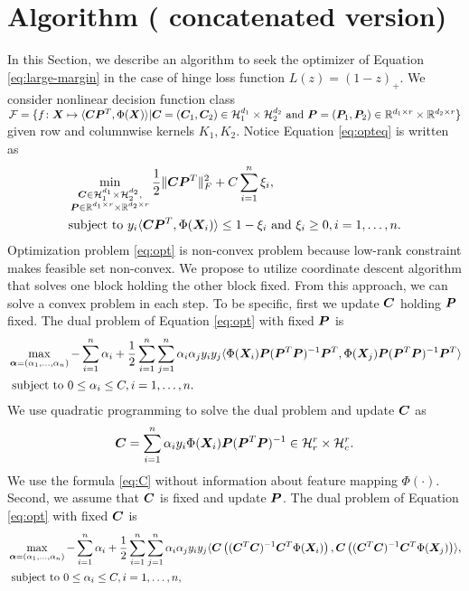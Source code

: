 \documentclass[12pt]{article}
\begin{document}
\section{Algorithm ({\color{red} concatenated version})}
\label{sec:alg}
In this Section, we describe an algorithm to seek the optimizer of Equation  \eqref{eq:large-margin} in the case of hinge loss function $L(z) = (1-z)_+$. We consider nonlinear decision function class $\mathcal{F} = \{f\colon\bm X\mapsto\langle\bm C \bm{P}^T,\Phi(\bm X)\rangle|\bm C = (\bm C_1,\bm C_2)\in\mathcal{H}_1^{d_1}\times \mathcal{H}_2^{d_2} \text{ and }\bm{P} = (\bm{P}_1,\bm{P}_2)\in\mathbb{R}^{d_1\times r} \times \mathbb{R}^{d_2\times r}\}$ given row and columnwise kernels $K_1,K_2$.
Notice Equation \eqref{eq:opteq} is written as 
\begin{align}
    \label{eq:opt}
    &\min_{\substack{\bm C\in\mathcal{H}_1^{d_1}\times \mathcal{H}_2^{d_2} ,\\\bm{P}\in\mathbb{R}^{d_1\times r} \times \mathbb{R}^{d_2\times r}}}\frac{1}{2}\lVert\bm C\bm{P}^T\rVert_F^2+ C\sum_{i=1}^n \xi_i,\\
    &\text{subject to } y_i\langle\bm C\bm{P}^T,\Phi(\bm X_i)\rangle\leq 1-\xi_i\text{ and } \xi_i\geq 0, i=1,\ldots,n.
\end{align}
Optimization problem \eqref{eq:opt} is non-convex problem because low-rank constraint makes feasible set non-convex.
We propose to utilize coordinate descent algorithm that solves one block holding the other block fixed. From this approach, we can solve a convex problem in each step.
To be specific, first we update $\bm C$ holding $\bm{P}$ fixed.
The dual problem of Equation \eqref{eq:opt} with fixed $\bm{P}$ is 
\begin{align}
    \label{eq:dual1}
    &\max_{\bm\alpha = (\alpha_1,\ldots,\alpha_n)}-\sum_{i=1}^n\alpha_i + \frac{1}{2}\sum_{i=1}^n\sum_{j=1}^n \alpha_i\alpha_j y_iy_j \langle \Phi(\bm X_i)\bm{P}(\bm{P}^T\bm{P})^{-1}\bm{P}^T,\Phi(\bm X_j)\bm{P}(\bm{P}^T\bm{P})^{-1}\bm{P}^T\rangle\\
    &\text{ subject to }  0\leq \alpha_i\leq C, i=1,\ldots,n.
\end{align}
We use quadratic programming to solve the dual problem and update $\bm C$ as
\begin{align}\label{eq:C}
    \bm C = \sum_{i=1}^n \alpha_iy_i \Phi(\bm X_i) \bm{P}(\bm{P}^T\bm{P})^{-1}\in\mathcal{H}_r^r\times \mathcal{H}_c^r.
\end{align}
We use the formula \eqref{eq:C} without information about feature mapping $\Phi(\cdot)$.
Second, we assume that $\bm C$ is fixed and update $\bm{P}$. The dual problem of Equation \eqref{eq:opt} with fixed $\bm C$ is 
\begin{align}
    \label{eq:dual2}
    &\max_{\bm\alpha = (\alpha_1,\ldots,\alpha_n)}-\sum_{i=1}^n\alpha_i + \frac{1}{2}\sum_{i=1}^n\sum_{j=1}^n \alpha_i\alpha_j y_iy_j\langle 
    \bm C\left((\bm C^T\bm C)^{-1}\bm C^T\Phi(\bm X_i)\right),\bm C\left((\bm C^T\bm C)^{-1}\bm C^T\Phi(\bm X_j)\right)\rangle,\\
    &\text{ subject to }  0\leq \alpha_i\leq C, i=1,\ldots,n,
\end{align}
\end{document}
